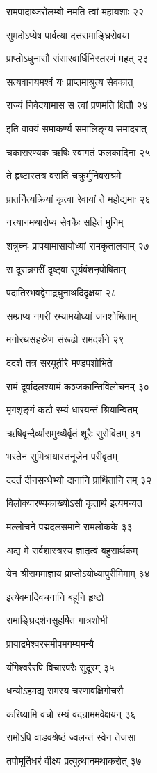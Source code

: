 रामपादाब्जरोलम्बो नमति त्वां महायशाः २२

सुमदोऽप्येष पार्वत्या दत्तरामाङ्घ्रिसेवया

प्राप्तोऽधुनासौ संसारवार्धिनिस्तरणं महत् २३

सत्यवानयमश्वं यः प्राप्तमाश्रुत्य सेवकात्

राज्यं निवेदयामास स त्वां प्रणमति क्षितौ २४

इति वाक्यं समाकर्ण्य समालिङ्ग्य समादरात्

चकारारण्यक ऋषिः स्वागतं फलकादिना २५

ते हृष्टास्तत्र वसतिं चक्रुर्मुनिवराश्रमे

प्रातर्नित्यक्रियां कृत्वा रेवायां ते महोद्यमाः २६

नरयानमथारोप्य सेवकैः सहितं मुनिम्

शत्रुघ्नः प्रापयामासायोध्यां रामकृतालयाम् २७

स दूरान्नगरीं दृष्ट्वा सूर्यवंशनृपोषिताम्

पदातिरभवद्वेगाद्रघुनाथदिदृक्षया २८

सम्प्राप्य नगरीं रम्यामयोध्यां जनशोभिताम्

मनोरथसहस्रेण संरूढो रामदर्शने २९

ददर्श तत्र सरयूतीरे मण्डपशोभिते

रामं दूर्वादलश्यामं कञ्जकान्तिविलोचनम् ३०

मृगशृङ्गं कटौ रम्यं धारयन्तं श्रियान्वितम्

ऋषिवृन्दैर्व्यासमुख्यैर्वृतं शूरैः सुसेवितम् ३१

भरतेन सुमित्रायास्तनूजेन परीवृतम्

ददतं दीनसन्धेभ्यो दानानि प्रार्थितानि तम् ३२

विलोक्यारण्यकाख्योऽसौ कृतार्थ इत्यमन्यत

मल्लोचने पद्मदलसमाने रामलोकके ३३

अद्य मे सर्वशास्त्रस्य ज्ञातृत्वं बहुसार्थकम्

येन श्रीराममाज्ञाय प्राप्तोऽयोध्यापुरीमिमाम् ३४

इत्येवमादिवचनानि बहूनि हृष्टो

रामाङ्घ्रिदर्शनसुहर्षित गात्रशोभी

प्रायाद्रमेश्वरसमीपमगम्यमन्यै-

र्योगेश्वरैरपि विचारपरैः सुदूरम् ३५

धन्योऽहमद्य रामस्य चरणावक्षिगोचरौ

करिष्यामि वचो रम्यं वदन्राममवेक्षयन् ३६

रामोऽपि वाडवश्रेष्ठं ज्वलन्तं स्वेन तेजसा

तपोमूर्तिधरं वीक्ष्य प्रत्युत्थानमथाकरोत् ३७

